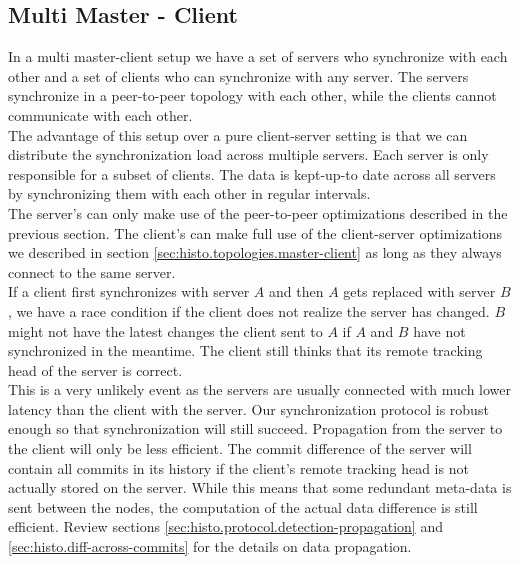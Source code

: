 \subsection{Multi Master - Client}
\label{sec:histo.topologies.multi-master}
In a multi master-client setup we have a set of servers who synchronize with each other and a set of clients who can synchronize with any server.
The servers synchronize in a peer-to-peer topology with each other, while the clients cannot communicate with each other.\\
The advantage of this setup over a pure client-server setting is that we can distribute the synchronization load across multiple servers.
Each server is only responsible for a subset of clients.
The data is kept-up-to date across all servers by synchronizing them with each other in regular intervals.\\
The server's can only make use of the peer-to-peer optimizations described in the previous section.
The client's can make full use of the client-server optimizations we described in section \ref{sec:histo.topologies.master-client} as long as they always connect to the same server.\\
If a client first synchronizes with server $ A $ and then $ A $ gets replaced with server $ B $, we have a race condition if the client does not realize the server has changed.
$ B $ might not have the latest changes the client sent to $ A $ if $ A $ and $ B $ have not synchronized in the meantime.
The client still thinks that its remote tracking head of the server is correct.\\
This is a very unlikely event as the servers are usually connected with much lower latency than the client with the server.
Our synchronization protocol is robust enough so that synchronization will still succeed.
Propagation from the server to the client will only be less efficient.
The commit difference of the server will contain all commits in its history if the client's remote tracking head is not actually stored on the server.
While this means that some redundant meta-data is sent between the nodes, the computation of the actual data difference is still efficient.
Review sections \ref{sec:histo.protocol.detection-propagation} and \ref{sec:histo.diff-across-commits} for the details on data propagation.

